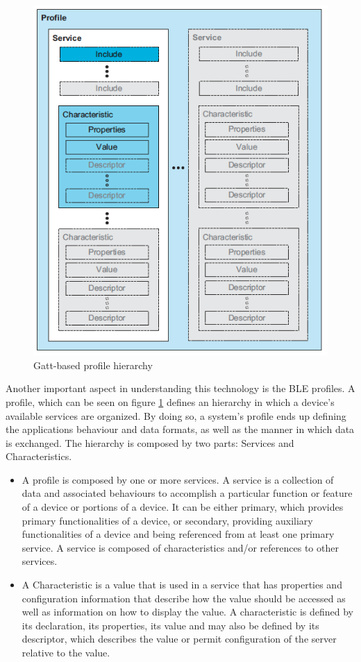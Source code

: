 \documentclass[a4paper]{IEEEtran}
\begin{document}
\begin{figure} 
\centering 
\includegraphics[width=0.5\linewidth]{figures/profile.png} 
\caption[Gatt-based profile hierarchy]{Gatt-based profile hierarchy} 
\label{fig:profile} 
\end{figure} 
 
Another important aspect in understanding this technology is the BLE profiles. A profile, which can be seen on figure \ref{fig:profile} defines an hierarchy in which a device's available services are organized. By doing so, a system's profile ends up defining the applications behaviour and data formats, as well as the manner in which data is exchanged. The hierarchy is composed by two parts: Services and Characteristics. 
 
\begin{itemize} 
\item A profile is composed by one or more services. A service is a collection of data and associated behaviours to accomplish a particular function or feature of a device or portions of a device. It can be either primary, which provides primary functionalities of a device, or secondary, providing auxiliary functionalities of a device and being referenced from at least one primary service. A service is composed of characteristics and/or references to other services. 
 
 
\item A Characteristic is a value that is used in a service that has properties and configuration information that describe how the value should be accessed as well as information on how to display the value. A characteristic is defined by its declaration, its properties, its value and may also be defined by its descriptor, which describes the value or permit configuration of 
the server relative to the value. 
\end{itemize} 
 
\end{document}
